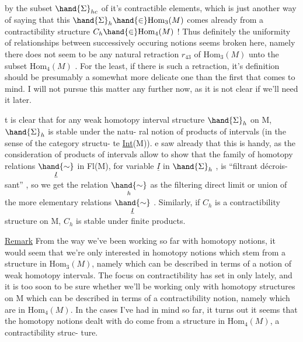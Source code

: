 
by the subset $\hand{\Sigma}_{hc}$ of it's contractible elements, which is just another
way of saying that this $\hand{\Sigma}_h \hand{\in} \mathrm{Hom}_3(M)$ comes already from a contractibility
structure $C_h \hand{\in} \mathrm{Hom}_4(M)$ ! Thus definitely the uniformity of  relationships
between successively occuring notions seems broken here, namely there
does not seem to be any natural retraction $r_{43}$ of $\mathrm{Hom}_3(M)$ unto the subset
$\mathrm{Hom}_4(M)$ . For the least, if there is such a retraction, it's definition
should be presumably a somewhat more delicate one than the first that 
comes to mind. I will not pursue this matter any further now, as it is
not clear if we'll need it later.

 t is clear that  for any
weak homotopy interval structure $\hand{\Sigma}_h$ on M, $\hand{\Sigma}_h$ is stable under the natu-%
ral notion of  products of intervals (in the sense of the category structu-%
te  \uline{Int}(M)). e saw already that this is handy, as the consideration
of products of intervals allow to show that the family of homotopy
relations $\underset{\underline{I}}{\hand{\sim}}$ in Fl(M), for variable $\underline{I}$ in $\hand{\Sigma}_h$ , is ``filtrant décrois-%
sant'' , so we get the relation $\underset{h}{\hand{\sim}}$ as the filtering direct limit or
union of the more elementary relations $\underset{\underline{I}}{\hand{\sim}}$ . Similarly, if $C_h$  is a
contractibility structure on M, $C_h$ is stable under finite products.

\uline{Remark} From the way we've been working so far with homotopy notions, it
would seem that we're only interested  in homotopy notions which stem
from a structure in $\mathrm{Hom}_3(M)$, namely which can be described in terms of a
notion of weak homotopy intervals. The focus on contractibility has set
in only lately, and it is too soon to be sure whether we'll be working
only with homotopy structures on M which can be described in terms of a
contractibility notion, namely which are in $\mathrm{Hom}_4(M)$. In the cases I've
had in mind so far, it turns out  it seems that the homotopy notions
dealt with do come from a structure in $\mathrm{Hom}_4(M)$,  a contractibility struc-%
ture.

